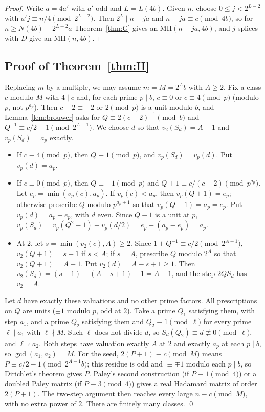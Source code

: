 \documentclass[10pt]{article}
\theoremstyle{remark}
\newcommand{\MH}{\mathrm{MH}}
\begin{document}
\begin{proof}
Write $a=4a'$ with $a'$ odd and $L=L(4b)$. Given $n$, choose $0\le j<2^{L-2}$ with $a'j\equiv n/4\pmod{2^{L-2}}$. Then $2^L\mid n-ja$ and $n-ja\equiv c\pmod{4b}$, so for $n\ge N(4b)+2^{L-2}a$ Theorem~\ref{thm:G} gives an $\MH(n-ja,4b)$, and $j$ splices with $D$ give an $\MH(n,4b)$.
\end{proof}

\subsection{Proof of Theorem~\ref{thm:H}}
Replacing $m$ by a multiple, we may assume $m=M=2^Ab$ with $A\ge2$. Fix a class $c$ modulo $M$ with $4\mid c$ and, for each prime $p\mid b$, $c\equiv0$ or $c\equiv4\pmod p$ (modulo $p$, not $p^{a_p}$). Then $c-2\equiv-2$ or $2\pmod p$ is a unit modulo $b$, and Lemma~\ref{lem:brouwer} asks for $Q\equiv2(c-2)^{-1}\pmod b$ and $Q^{-1}\equiv c/2-1\pmod{2^{A-1}}$. We choose $d$ so that $v_2(S_d)=A-1$ and $v_p(S_d)=a_p$ exactly.
\begin{itemize}
\item If $c\equiv4\pmod p$, then $Q\equiv1\pmod p$, and $v_p(S_d)=v_p(d)$. Put $v_p(d)=a_p$.
\item If $c\equiv0\pmod p$, then $Q\equiv-1\pmod p$ and $Q+1\equiv c/(c-2)\pmod{p^{a_p}}$. Let $e_p=\min(v_p(c),a_p)$. If $v_p(c)<a_p$, then $v_p(Q+1)=e_p$; otherwise prescribe $Q$ modulo $p^{a_p+1}$ so that $v_p(Q+1)=a_p=e_p$. Put $v_p(d)=a_p-e_p$, with $d$ even. Since $Q-1$ is a unit at $p$, $v_p(S_d)=v_p(Q^2-1)+v_p(d/2)=e_p+(a_p-e_p)=a_p$.
\item At $2$, let $s=\min(v_2(c),A)\ge2$. Since $1+Q^{-1}\equiv c/2\pmod{2^{A-1}}$, $v_2(Q+1)=s-1$ if $s<A$; if $s=A$, prescribe $Q$ modulo $2^A$ so that $v_2(Q+1)=A-1$. Put $v_2(d)=A-s+1\ge1$. Then $v_2(S_d)=(s-1)+(A-s+1)-1=A-1$, and the step $2QS_d$ has $v_2=A$.
\end{itemize}
Let $d$ have exactly these valuations and no other prime factors. All prescriptions on $Q$ are units ($\pm1$ modulo $p$, odd at $2$). Take a prime $Q_1$ satisfying them, with step $a_1$, and a prime $Q_2$ satisfying them and $Q_2\equiv1\pmod\ell$ for every prime $\ell\mid a_1$ with $\ell\nmid M$. Such $\ell$ does not divide $d$, so $S_d(Q_2)\equiv d\not\equiv0\pmod\ell$, and $\ell\nmid a_2$. Both steps have valuation exactly $A$ at $2$ and exactly $a_p$ at each $p\mid b$, so $\gcd(a_1,a_2)=M$. For the seed, $2(P+1)\equiv c\pmod M$ means $P\equiv c/2-1\pmod{2^{A-1}b}$; this residue is odd and $\equiv\mp1$ modulo each $p\mid b$, so Dirichlet's theorem gives $P$. Paley's second construction (if $P\equiv1\pmod4$) or a doubled Paley matrix (if $P\equiv3\pmod4$) gives a real Hadamard matrix of order $2(P+1)$. The two-step argument then reaches every large $n\equiv c\pmod M$, with no extra power of $2$. There are finitely many classes. \qed
\end{document}
